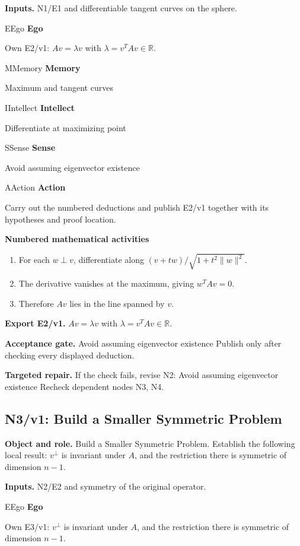 \documentclass[preprint,12pt,aps,pra,showkeys,amsmath,amssymb,superscriptaddress,floatfix]{revtex4-2}
\theoremstyle{definition}
\theoremstyle{remark}
\newcommand{\mmfaculty}[3]{%
 \begin{mmfacultybox}{#1}{#2}
 {\sffamily\bfseries\color{MMBlue}#2}\par\smallskip #3
 \end{mmfacultybox}}
\newcommand{\field}[2]{\par\smallskip\noindent\textbf{#1.} #2\par}
\begin{document}
\field{Inputs}{N1/E1 and differentiable tangent curves on the sphere.}

\mmfaculty{E}{Ego}{Own E2/v1: \(Av=\lambda v\) with \(\lambda=v^TAv\in\mathbb R\).}

\mmfaculty{M}{Memory}{Maximum and tangent curves}

\mmfaculty{I}{Intellect}{Differentiate at maximizing point}

\mmfaculty{S}{Sense}{Avoid assuming eigenvector existence}

\mmfaculty{A}{Action}{Carry out the numbered deductions and publish E2/v1 together with its
hypotheses and proof location.}

\smallskip\noindent\textbf{Numbered mathematical activities}

\begin{enumerate}[label=N2.\arabic*,leftmargin=3.4em]

\item For each \(w\perp v\), differentiate along
\((v+tw)/\sqrt{1+t^2\|w\|^2}\).

\item The derivative vanishes at the maximum, giving \(w^TAv=0\).

\item Therefore \(Av\) lies in the line spanned by \(v\).

\end{enumerate}

\field{Export E2/v1}{\(Av=\lambda v\) with \(\lambda=v^TAv\in\mathbb R\).}

\field{Acceptance gate}{Avoid assuming eigenvector existence Publish only after checking every
displayed deduction.}

\field{Targeted repair}{If the check fails, revise N2: Avoid assuming eigenvector existence
Recheck dependent nodes N3, N4.}

\clearpage

\subsection{N3/v1: Build a Smaller Symmetric Problem}

\field{Object and role}{Build a Smaller Symmetric Problem. Establish the following local result:
\(v^\perp\) is invariant under \(A\), and the restriction there is
symmetric of dimension \(n-1\).}

\field{Inputs}{N2/E2 and symmetry of the original operator.}

\mmfaculty{E}{Ego}{Own E3/v1: \(v^\perp\) is invariant under \(A\), and the restriction
there is symmetric of dimension \(n-1\).}
\end{document}
